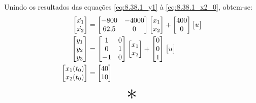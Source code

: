 \documentclass{report}
\begin{document}
Unindo os resultados das equações \ref{eq:8.38.1_y1} à \ref{eq:8.38.1_x2_0}, obtem-se:
\begin{equation}
      \label{eq:8.38.1_sol}
      \centering
      \begin{split}
          \begin{bmatrix} \dot{x_1} \\ \dot{x_2} \end{bmatrix} &= \begin{bmatrix} -800 & -4000 \\ 62,\!5 & 0 \end{bmatrix}
          \begin{bmatrix} x_1 \\ x_2 \end{bmatrix} + \begin{bmatrix} 400 \\ 0 \end{bmatrix} \begin{bmatrix} u \end{bmatrix} \\
          \begin{bmatrix} y_1 \\ y_2 \\ y_3 \end{bmatrix} &= \begin{bmatrix} 1 & 0 \\ 0 & 1 \\ -1 & 0 \end{bmatrix}
          \begin{bmatrix} x_1 \\ x_2 \end{bmatrix} + \begin{bmatrix} 0 \\ 0 \\ 1 \end{bmatrix} \begin{bmatrix} u \end{bmatrix} \\
          \begin{bmatrix} x_1(t_0) \\ x_2(t_0) \end{bmatrix} &= \begin{bmatrix} 40 \\ 10 \end{bmatrix}
      \end{split}
\end{equation}

\begin{center}
      \[ \scalebox{3}{$ * $} \]
\end{center}
\end{document}
